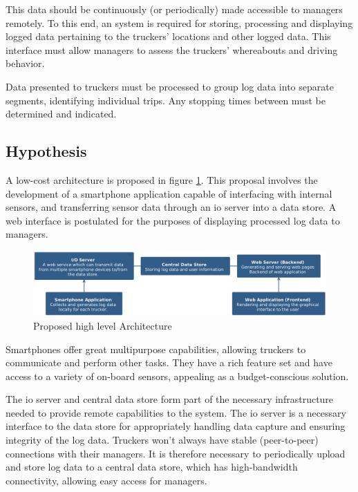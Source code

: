 This data should be continuously (or periodically) made accessible to managers remotely.
To this end, an system is required for storing, processing and displaying logged data pertaining to the truckers' locations and other logged data.
This interface must allow managers to assess the truckers' whereabouts and driving behavior.

Data presented to truckers must be processed to group log data into separate segments, identifying individual trips.
Any stopping times between must be determined and indicated.

\pagebreak
\subsection{Hypothesis}
A low-cost architecture is proposed in figure \ref{fig:hypothesis}.
This proposal involves the development of a smartphone application capable of interfacing with internal sensors, and transferring sensor data through an \ac{io} server into a data store.
A web interface is postulated for the purposes of displaying processed log data to managers.\cite{bertocco1998client}

\begin{figure}[H]
    \centering
    \includegraphics[width=6in]{../diag/hypothesis.png}
    \caption{Proposed high level Architecture}
    \label{fig:hypothesis}
\end{figure}

Smartphones offer great multipurpose capabilities, allowing truckers to communicate and perform other tasks.
They have a rich feature set and have access to a variety of on-board sensors, appealing as a budget-conscious solution.

The \ac{io} server and central data store form part of the necessary infrastructure needed to provide remote capabilities to the system.
The \ac{io} server is a necessary interface to the data store for appropriately handling data capture and ensuring integrity of the log data.
Truckers won't always have stable (peer-to-peer) connections with their managers.
It is therefore necessary to periodically upload and store log data to a central data store, which has high-bandwidth connectivity, allowing easy access for managers.

